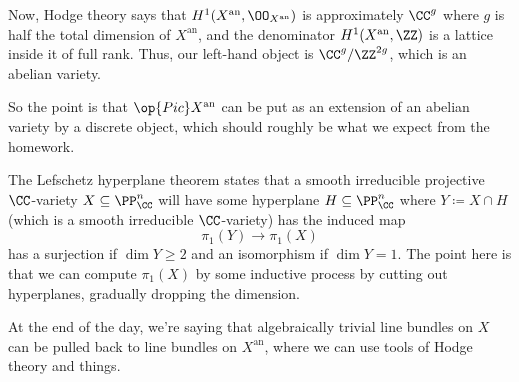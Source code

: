 \documentclass[../notes.tex]{subfiles}
\begin{document}
Now, Hodge theory says that $H^1(X^{\mathrm{an}},\OO_{X^{\mathrm{an}}})$ is approximately $\CC^g$ where $g$ is half the total dimension of $X^{\mathrm{an}}$, and the denominator $H^1(X^{\mathrm{an}},\ZZ)$ is a lattice inside it of full rank. Thus, our left-hand object is $\CC^g/\ZZ^{2g}$, which is an abelian variety.

So the point is that $\op{Pic}X^{\mathrm{an}}$ can be put as an extension of an abelian variety by a discrete object, which should roughly be what we expect from the homework.
\begin{remark}
	The Lefschetz hyperplane theorem states that a smooth irreducible projective $\CC$-variety $X\subseteq\PP^n_\CC$ will have some hyperplane $H\subseteq\PP^n_\CC$ where $Y\coloneqq X\cap H$ (which is a smooth irreducible $\CC$-variety) has the induced map
	\[\pi_1(Y)\to\pi_1(X)\]
	has a surjection if $\dim Y\ge2$ and an isomorphism if $\dim Y=1$. The point here is that we can compute $\pi_1(X)$ by some inductive process by cutting out hyperplanes, gradually dropping the dimension.
\end{remark}
\begin{remark}
	At the end of the day, we're saying that algebraically trivial line bundles on $X$ can be pulled back to line bundles on $X^{\mathrm{an}}$, where we can use tools of Hodge theory and things.
\end{remark}
\end{document}

